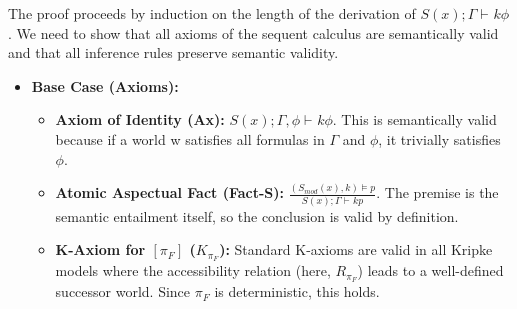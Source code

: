 \documentclass[
    12pt,              %
    a4paper,           %
    headings=normal,   %
    twoside=true,      %
    BCOR=8mm,          %
]{scrbook}
\newcommand{\Smodx}{S_{mod}(x)}
\newcommand{\dynboxgen}[1]{[#1]}
\newcommand{\turnstilek}[1][]{\vdash^{#1}}
\begin{document}
\begin{myproof}
The proof proceeds by induction on the length of the derivation of \(S(x); \Gamma \turnstilek{k} \phi\). We need to show that all axioms of the sequent calculus are semantically valid and that all inference rules preserve semantic validity.

\begin{itemize}
    \item   \textbf{Base Case (Axioms):}
        \begin{itemize}
            \item   \textbf{Axiom of Identity (Ax):} \(S(x); \Gamma, \phi \turnstilek{k} \phi\). This is semantically valid because if a world w satisfies all formulas in \(\Gamma\) and \(\phi\), it trivially satisfies \(\phi\).
            \item   \textbf{Atomic Aspectual Fact (Fact-S):} \(\frac{(\Smodx, k) \vDash p}{S(x); \Gamma \turnstilek{k} p}\). The premise is the semantic entailment itself, so the conclusion is valid by definition.
            \item   \textbf{K-Axiom for \(\dynboxgen{\pi_F}\) (\(K_{\pi_F}\)):} Standard K-axioms are valid in all Kripke models where the accessibility relation (here, \(R_{\pi_F}\)) leads to a well-defined successor world. Since \(\pi_F\) is deterministic, this holds.
        \end{itemize}


\end{itemize}
\end{myproof}
\end{document}
